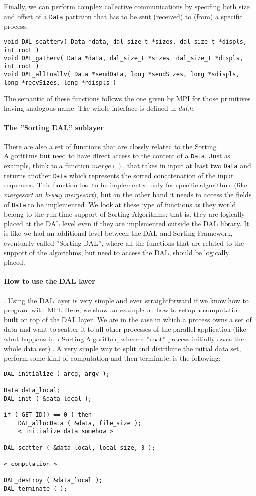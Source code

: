 Finally, we can perform complex collective communications by specifing both size and offset of a \texttt{Data} partition that has to be sent (received) to (from) a specific process. 
\begin{lstlisting}
void DAL_scatterv( Data *data, dal_size_t *sizes, dal_size_t *displs, int root )
void DAL_gatherv( Data *data, dal_size_t *sizes, dal_size_t *displs, int root )
void DAL_alltoallv( Data *sendData, long *sendSizes, long *sdispls, long *recvSizes, long *rdispls )
\end{lstlisting}
The semantic of these functions follows the one given by MPI for those primitives having analogous name. The whole interface is defined in \textit{dal.h}.

\paragraph{The ''Sorting DAL'' sublayer} There are also a set of functions that are closely related to the Sorting Algorithms but need to have direct access to the content of a \texttt{Data}.  Just as example, think to a function $merge()$, that takes in input at least two \texttt{Data} and returns another \texttt{Data} which represents the sorted concatenation of the input sequences. This function has to be implemented only for specific algorithms (like \textit{mergesort} an \textit{k-way mergesort}), but on the other hand it needs to access the fields of \texttt{Data} to be implemented. We look at these type of functions as they would belong to the run-time support of Sorting Algorithms: that is, they are logically placed at the DAL level even if they are implemented outside the DAL library. It is like we had an additional level between the DAL and Sorting Framework, eventually called ''Sorting DAL'', where all the functions that are related to the support of the algorithms, but need to access the DAL, should be logically placed. 

\paragraph{How to use the DAL layer}. Using the DAL layer is very simple and even straightforward if we know how to program with MPI. Here, we show an example on how to setup a computation built on top of the DAL layer. We are in the case in which a process owns a set of data and want to scatter it to all other processes of the parallel application (like what happens in a Sorting Algorithm, where a ''root'' process initially owns the whole data set) . A very simple way to split and distribute the initial data set, perform some kind of computation and then terminate, is the following:
\begin{lstlisting}
DAL_initialize ( arcg, argv );

Data data_local;
DAL_init ( &data_local );

if ( GET_ID() == 0 ) then
	DAL_allocData ( &data, file_size );
	< initialize data somehow >
	
DAL_scatter ( &data_local, local_size, 0 );

< computation >

DAL_destroy ( &data_local );	
DAL_terminate ( );
\end{lstlisting}


